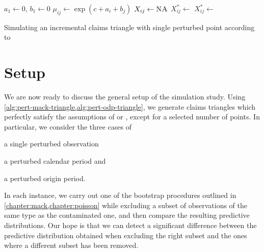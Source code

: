 \documentclass[a4paper]{book}
\begin{document}
\begin{algorithm}[!htb]
  \begin{algorithmic}
    \State $a_1 \gets 0$, $b_1 \gets 0$
      \State $\mu_{ij} \gets \exp(c + a_i + b_j)$
      \State $X_{ij} \gets \textsc{NA}$
    \EndFor
          \State $X^*_{ij} \gets$ 
        \Else
          \State $X^*_{ij} \gets$ 
        \EndIf
      \EndFor
    \EndFor
    \State {}
  \end{algorithmic}
  \caption{Simulating an incremental claims triangle with single perturbed point according to }
  \label{alg:pert-odp-triangle}
\end{algorithm}

\section{Setup}

We are now ready to discuss the general setup of the simulation study. Using \cref{alg:pert-mack-triangle,alg:pert-odp-triangle}, we generate claims triangles which perfectly satisfy the assumptions of  or , except for a selected number of points. In particular, we consider the three cases of
\begin{inparaenum}[(i)]
  \item a single perturbed observation
  \item a perturbed calendar period and
  \item a perturbed origin period.
\end{inparaenum}
In each instance, we carry out one of the bootstrap procedures outlined in \cref{chapter:mack,chapter:poisson} while excluding a subset of observations of the same type as the contaminated one, and then compare the resulting predictive distributions. Our hope is that we can detect a significant difference between the predictive distribution obtained when excluding the right subset and the ones where a different subset has been removed.
\end{document}
